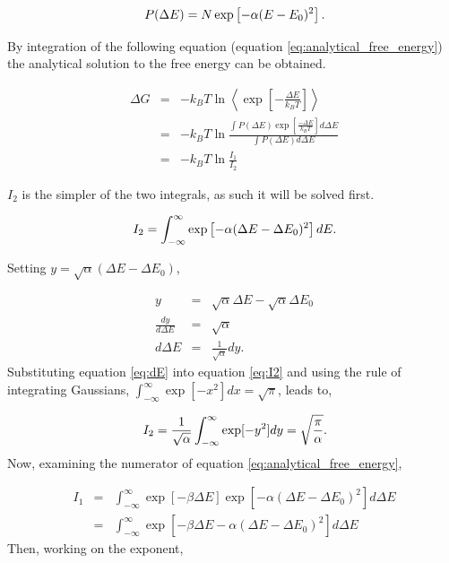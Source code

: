 \begin{equation}
\ P(\Delta E)=N \exp \left[ - \alpha ( E- E_0)^2  \right] \\.
\end{equation}

By integration of the following equation (equation \ref{eq:analytical_free_energy}) the analytical solution to the free energy can be obtained.  

\begin{eqnarray}
\ \Delta G &=& -k_BT \ln \left\langle \exp \left[-\frac{\Delta E}{k_BT}\right] \right\rangle \\
&=& -k_{B}T \ln \frac{\int P(\Delta E) \exp \left[ \frac{-\Delta E}{k_BT}\right] d \Delta E}{\int P(\Delta E)d \Delta E} \label{eq:analytical_free_energy} \\
\ &=& -k_B T \ln \frac{I_1}{I_2}
\end{eqnarray}

$I_2$ is the simpler of the two integrals, as such it will be solved first.

\begin{equation} \label{eq:I2}
\ I_2 =\int_{-\infty}^{\infty} \exp \left[ - \alpha (\Delta E- \Delta E_0)^2  \right] dE \\.
\end{equation}

Setting $y=\sqrt{\alpha}(\Delta E- \Delta E_0)$,

\begin{eqnarray}
\ y &=& \sqrt{\alpha}\Delta E-\sqrt{\alpha} \Delta E_0 \\
\ \frac{dy}{d\Delta E} &=& \sqrt{\alpha} \\
\ d\Delta E &=& \frac{1}{\sqrt{\alpha}}dy \label{eq:dE} .
\end{eqnarray}
%
Substituting equation \ref{eq:dE} into equation \ref{eq:I2} and using the rule of integrating Gaussians, $\int_{-\infty}^{\infty} \exp [ -x^2] dx= \sqrt{\pi}$, leads to,

\begin{equation}
\ I_2 = \frac{1}{\sqrt{\alpha}}\int_{-\infty}^{\infty} \exp [-y^2] dy = \sqrt{\frac{\pi}{\alpha}} \\.
\end{equation}
%
Now, examining the numerator of equation \ref{eq:analytical_free_energy},

\begin{eqnarray}
\ I_1 &=& \int_{-\infty}^{\infty} \exp\left[ -\beta \Delta E \right] \exp \left[ - \alpha(\Delta E- \Delta E_0)^2 \right] d \Delta E \\
\ &=& \int_{-\infty}^{\infty} \exp\left[ -\beta \Delta E- \alpha(\Delta E- \Delta E_0)^2 \right] d \Delta E
\end{eqnarray}
%
Then, working on the exponent,

